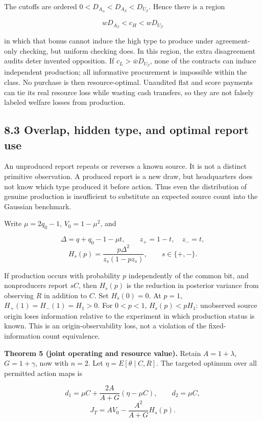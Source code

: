 \documentclass[
  11pt,
]{article}
\begin{document}
The cutoffs are ordered \(0<D_{A_\alpha}<D_{A_\beta}<D_{U_\beta}\).
Hence there is a region

\[wD_{A_\beta}<c_H<wD_{U_\beta} \tag{I5}\]

in which that bonus cannot induce the high type to produce under
agreement-only checking, but uniform checking does. In this region, the
extra disagreement audits deter invented opposition. If
\(c_L>\bar wD_{U_\beta}\), none of the contracts can induce independent
production; all informative procurement is impossible within the class.
No purchase is then resource-optimal. Unaudited flat and score payments
can tie its real resource loss while wasting cash transfers, so they are
not falsely labeled welfare losses from production.

\subsection{8.3 Overlap, hidden type, and optimal report
use}\label{overlap-hidden-type-and-optimal-report-use}

An unproduced report repeats or reverses a known source. It is not a
distinct primitive observation. A produced report is a new draw, but
headquarters does not know which type produced it before action. Thus
even the distribution of genuine production is insufficient to
substitute an expected source count into the Gaussian benchmark.

Write \(\mu=2q_0-1\), \(V_0=1-\mu^2\), and

\[\Delta=q+q_0-1-\mu t,\qquad
z_+=1-t,\quad z_-=t,\]
\[H_s(p)=\frac{p\Delta^2}{z_s(1-pz_s)},\qquad s\in\{+,-\}. \tag{I6}\]

If production occurs with probability \(p\) independently of the common
bit, and nonproducers report \(sC\), then \(H_s(p)\) is the reduction in
posterior variance from observing \(R\) in addition to \(C\). Set
\(H_s(0)=0\). At \(p=1\), \(H_+(1)=H_-(1)=H_1>0\). For \(0<p<1\),
\(H_s(p)<pH_1\): unobserved source origin loses information relative to
the experiment in which production status is known. This is an
origin-observability loss, not a violation of the fixed-information
count equivalence.

\textbf{Theorem 5 (joint operating and resource value).} Retain
\(A=1+\lambda\), \(G=1+\gamma\), now with \(n=2\). Let
\(\eta=E[\theta\mid C,R]\). The targeted optimum over all permitted
action maps is

\[d_1=\mu C+\frac{2A}{A+G}(\eta-\mu C),\qquad d_2=\mu C,\]
\[J_T=AV_0-\frac{A^2}{A+G}H_s(p). \tag{I7}\]
\end{document}
